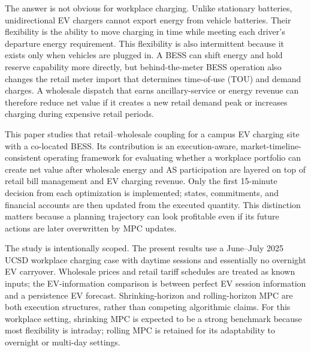 \documentclass[final,5p,times]{elsarticle}
\begin{document}
The answer is not obvious for workplace charging. Unlike stationary batteries, unidirectional EV chargers cannot export energy from vehicle batteries. Their flexibility is the ability to move charging in time while meeting each driver's departure energy requirement. This flexibility is also intermittent because it exists only when vehicles are plugged in. A BESS can shift energy and hold reserve capability more directly, but behind-the-meter BESS operation also changes the retail meter import that determines time-of-use (TOU) and demand charges. A wholesale dispatch that earns ancillary-service or energy revenue can therefore reduce net value if it creates a new retail demand peak or increases charging during expensive retail periods.

This paper studies that retail--wholesale coupling for a campus EV charging site with a co-located BESS. Its contribution is an execution-aware, market-timeline-consistent operating framework for evaluating whether a workplace portfolio can create net value after wholesale energy and AS participation are layered on top of retail bill management and EV charging revenue. Only the first 15-minute decision from each optimization is implemented; states, commitments, and financial accounts are then updated from the executed quantity. This distinction matters because a planning trajectory can look profitable even if its future actions are later overwritten by MPC updates.

The study is intentionally scoped. The present results use a June--July 2025 UCSD workplace charging case with daytime sessions and essentially no overnight EV carryover. Wholesale prices and retail tariff schedules are treated as known inputs; the EV-information comparison is between perfect EV session information and a persistence EV forecast. Shrinking-horizon and rolling-horizon MPC are both execution structures, rather than competing algorithmic claims. For this workplace setting, shrinking MPC is expected to be a strong benchmark because most flexibility is intraday; rolling MPC is retained for its adaptability to overnight or multi-day settings.
\end{document}
